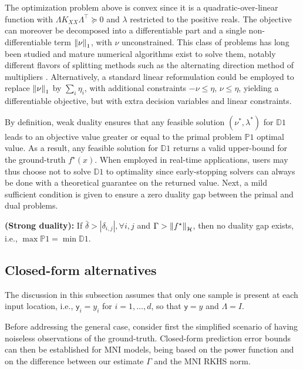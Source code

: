 The optimization problem above is convex since it is a quadratic-over-linear function with $\Lambda K_{XX} \Lambda^\top \succeq 0$ and $\lambda$ restricted to the positive reals. The objective can moreover be decomposed into a differentiable part and a single non-differentiable term $\left\| \nu \right\|_1$, with $\nu$ unconstrained. This class of problems has long been studied and mature numerical algorithms exist to solve them, notably different flavors of splitting methods such as the alternating direction method of multipliers \cite[§6]{boyd2011distributed}. Alternatively, a standard linear reformulation could be employed to replace $\left\| \nu \right\|_1$ by $\sum_i \eta_i$, with additional constraints $-\nu \leq \eta, \, \nu \leq \eta$, yielding a differentiable objective, but with extra decision variables and linear constraints. 

By definition, weak duality \citep[§5]{bertsekas2009convex} ensures that any feasible solution $(\nu^*,\lambda^*)$ for $\mathds{D}1$ leads to an objective value greater or equal to the primal problem $\mathds{P}1$ optimal value. As a result, any feasible solution for $\mathds{D}1$ returns a valid upper-bound for the ground-truth  $f^\star(x)$. When employed in real-time applications, users may thus choose not to solve $\mathds{D}1$ to optimality since early-stopping solvers can always be done with a theoretical guarantee on the returned value. Next, a mild sufficient condition is given to ensure a zero duality gap between the primal and dual problems.

\begin{proposition}
	\label{prop.strong_duality}
	{\normalfont \textbf{(Strong duality):}}
	If $\bar \delta > |\delta_{i,j}|, \forall i, j$ and $\Gamma > \left\| f^\star \right\|_\mathcal{H}$, then no duality gap exists, i.e., $\max \mathds{P}1 = \min \mathds{D}1$.
\end{proposition}


\subsection{Closed-form alternatives}

The discussion in this subsection assumes that only one sample is present at each input location, i.e., $\mathsf{y}_i = y_i$ for $i=1,\dots,d $, so that $\mathsf{y}=y$ and $\Lambda = I$.

Before addressing the general case, consider first the simplified scenario of having noiseless observations of the ground-truth. Closed-form prediction error bounds can then be established for MNI models, being based on the power function and on the  difference between our estimate $\Gamma$ and the MNI RKHS norm.

